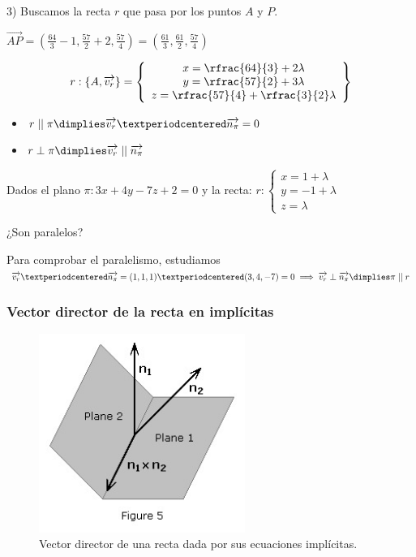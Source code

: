 \begin{problem}
3) Buscamos la recta $r$ que pasa por los puntos $A$ y $P$. 

$\vec{AP} = \left(\frac{64}{3}-1,\frac{57}{2}+2,\frac{57}{4}\right) =  \left(\frac{61}{3},\frac{61}{2},\frac{57}{4}\right)$

\[r : \{A,\vec{v_r}\} = \left\{\begin{array}{c}
    x = \rfrac{64}{3} + 2\lambda\\
    y = \rfrac{57}{2} + 3\lambda\\
    z = \rfrac{57}{4} + \rfrac{3}{2}\lambda
\end{array}\right\}\]

\end{problem}

\begin{itemize}
  \item $r \;||\; \pi \dimplies \vec{v_r}·\vec{n_{\pi}} = 0$
  \item $r\perp \pi \dimplies \vec{v_r}\;||\;\vec{n_{\pi}}$
\end{itemize}


\begin{problem}
Dados el plano $\pi:3x+4y-7z+2=0$ y la recta: $r:\left\{\begin{array}{c}x=1+\lambda\\y=-1+\lambda\\z=\lambda\end{array}\right.$

¿Son paralelos?
\solution

Para comprobar el paralelismo, estudiamos $\vec{v_r}·\vec{n_{\pi}} = (1,1,1)·(3,4,-7) = 0 \implies \vec{v_r}\perp\vec{n_{\pi}} \dimplies \pi\;||\; r$
\end{problem}

\subsubsection{Vector director de la recta en implícitas}

\begin{figure}[H]
\centering
\includegraphics[width=0.6\textwidth]{img/directorrectaimplicitas.jpg}
\caption{Vector director de una recta dada por sus ecuaciones implícitas.}
\label{fig::vectordirectorrectaimplicitas}
\end{figure}

